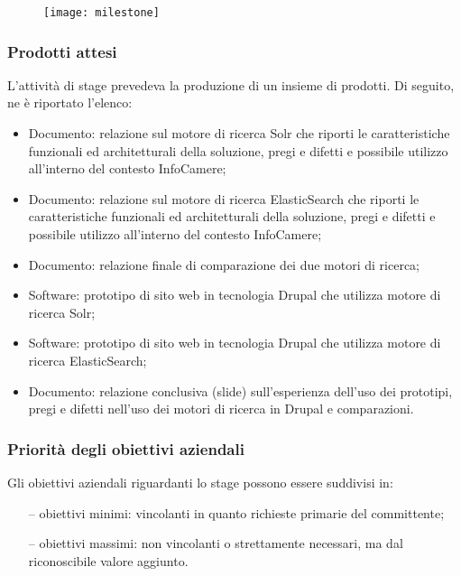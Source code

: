 		\begin{figure}[htbp]
			\begin{center}
				\texttt{[image: milestone]}
			\end{center}
		\end{figure}
	
		\subsubsection{Prodotti attesi}		
		L'attività di stage prevedeva la produzione di un insieme di prodotti. Di seguito, ne è riportato l'elenco:
		
		\begin{itemize}
			\item {Documento: relazione sul motore di ricerca \gls{Solr} che riporti le caratteristiche funzionali ed architetturali della soluzione, pregi e difetti e possibile utilizzo all'interno del contesto InfoCamere;}
			\item {Documento: relazione sul motore di ricerca \gls{ElasticSearch} che riporti le caratteristiche funzionali ed architetturali della soluzione, pregi e difetti e possibile utilizzo all'interno del contesto InfoCamere;}
			\item {Documento: relazione finale di comparazione dei due motori di ricerca;}
			\item {Software: prototipo di sito web in tecnologia \gls{Drupal} che utilizza motore di ricerca \gls{Solr};}
			\item {Software: prototipo di sito web in tecnologia \gls{Drupal} che utilizza motore di ricerca \gls{ElasticSearch};}
			\item {Documento: relazione conclusiva (slide) sull'esperienza dell'uso dei prototipi, pregi e difetti nell'uso dei motori di ricerca in \gls{Drupal} e comparazioni}.
		\end{itemize}
	
		\subsubsection{Priorità degli obiettivi aziendali}
		Gli obiettivi aziendali riguardanti lo stage possono essere suddivisi in:
		\begin{itemize}
			 \item[--] {obiettivi minimi: vincolanti in quanto richieste primarie del committente;}
			 \item[--] {obiettivi massimi: non vincolanti o strettamente necessari, ma dal riconoscibile valore aggiunto.}
	 	\end{itemize}
 	
